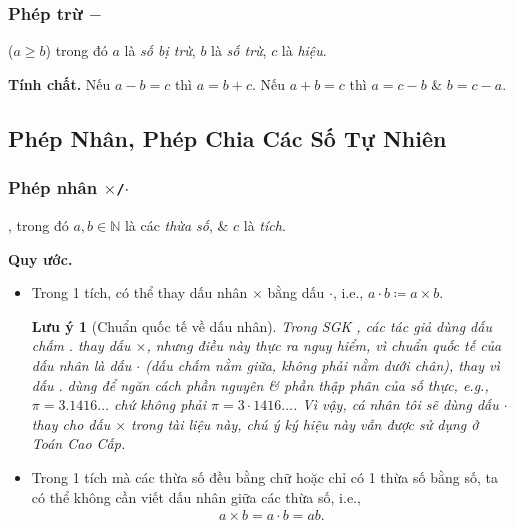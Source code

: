 \documentclass{article}
\numberwithin{equation}{section}
\newtheorem{remark}{Lưu ý}[section]
\begin{document}
\subsubsection{Phép trừ $-$}
 ($a\ge b$) trong đó $a$ là \textit{số bị trừ}, $b$ là \textit{số trừ}, $c$ là \textit{hiệu}.

\noindent\textbf{Tính chất.} Nếu $a - b = c$ thì $a = b + c$. Nếu $a + b = c$ thì $a = c - b$ \& $b = c - a$.

\subsection{Phép Nhân, Phép Chia Các Số Tự Nhiên}

\subsubsection{Phép nhân $\times$\texttt{/}$\cdot$}
, trong đó $a,b\in\mathbb{N}$ là các \textit{thừa số}, \& $c$ là \textit{tích}.

\noindent\textbf{Quy ước.}
\begin{itemize}
	\item Trong 1 tích, có thể thay dấu nhân $\times$ bằng dấu $\cdot$, i.e., $a\cdot b\coloneqq a\times b$.
	
	\begin{remark}[Chuẩn quốc tế về dấu nhân]
		Trong SGK \cite[p. 18]{Thai_Anh_Dat_Ha_Loan_Nam_Quang_Toan_6_tap_1}, các tác giả dùng dấu chấm $.$ thay dấu $\times$, nhưng điều này thực ra nguy hiểm, vì chuẩn quốc tế của dấu nhân là dấu $\cdot$ (dấu chấm nằm giữa, không phải nằm dưới chân), thay vì dấu $.$ dùng để ngăn cách phần nguyên \& phần thập phân của số thực, e.g., $\pi = 3.1416\ldots$ chứ không phải $\pi = 3\cdot 1416\ldots$. Vì vậy, cá nhân tôi sẽ dùng dấu $\cdot$ thay cho dấu $\times$ trong tài liệu này, chú ý ký hiệu này vẫn được sử dụng ở Toán Cao Cấp.
	\end{remark}
	\item Trong 1 tích mà các thừa số đều bằng chữ hoặc chỉ có 1 thừa số bằng số, ta có thể không cần viết dấu nhân giữa các thừa số, i.e.,
	\begin{align*}
		a\times b = a\cdot b = ab.
	\end{align*}
\end{itemize}
\end{document}
